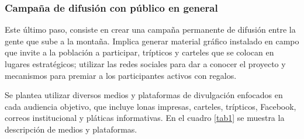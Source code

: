 





 
\subsubsection{Campaña de difusión con público en general}

Este último paso, consiste en crear una campaña permanente de difusión entre la gente que sube a la montaña. Implica generar material gráfico instalado en campo que invite a la población a participar, trípticos y carteles que se colocan en lugares estratégicos;  utilizar las redes sociales para dar a conocer el proyecto y mecanismos para premiar a los participantes activos con regalos. 


Se plantea utilizar diversos medios y plataformas de divulgación enfocados en cada audiencia objetivo, que incluye lonas impresas, carteles, trípticos, Facebook, correos institucional y pláticas informativas. En el cuadro \ref{tab1} se muestra la descripción de medios y plataformas.

